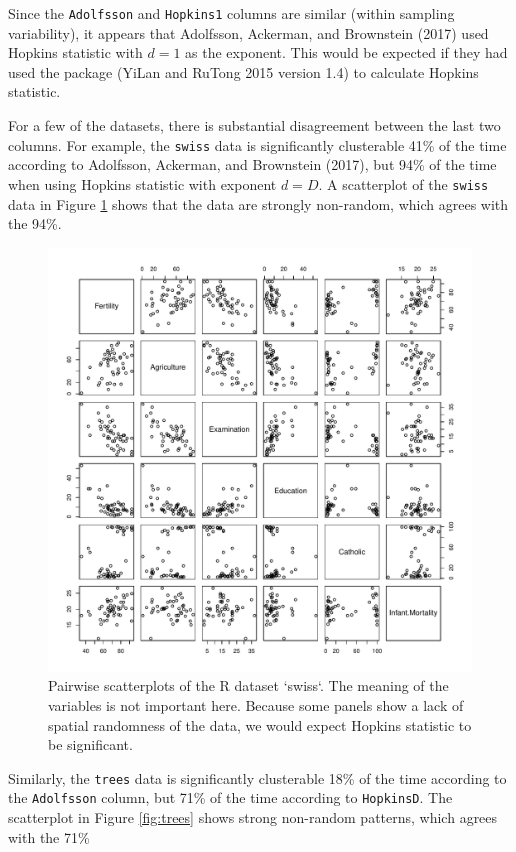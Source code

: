Since the \texttt{Adolfsson} and \texttt{Hopkins1} columns are similar (within sampling variability), it appears that Adolfsson, Ackerman, and Brownstein (2017) used Hopkins statistic with \(d=1\) as the exponent. This would be expected if they had used the  package (YiLan and RuTong 2015 version 1.4) to calculate Hopkins statistic.

For a few of the datasets, there is substantial disagreement between the last two columns. For example, the \texttt{swiss} data is significantly clusterable 41\% of the time according to Adolfsson, Ackerman, and Brownstein (2017), but 94\% of the time when using Hopkins statistic with exponent \(d=D\). A scatterplot of the \texttt{swiss} data in Figure \ref{fig:swiss} shows that the data are strongly non-random, which agrees with the 94\%.

\begin{figure}

{\centering \includegraphics[width=0.9\linewidth]{hopkins_files/figure-latex/swiss-1} 

}

\caption{Pairwise scatterplots of the R dataset `swiss`. The meaning of the variables is not important here. Because some panels show a lack of spatial randomness of the data, we would expect Hopkins statistic to be significant.}\label{fig:swiss}
\end{figure}

Similarly, the \texttt{trees} data is significantly clusterable 18\% of the time according to the \texttt{Adolfsson} column, but 71\% of the time according to \texttt{HopkinsD}. The scatterplot in Figure \ref{fig:trees} shows strong non-random patterns, which agrees with the 71\%

